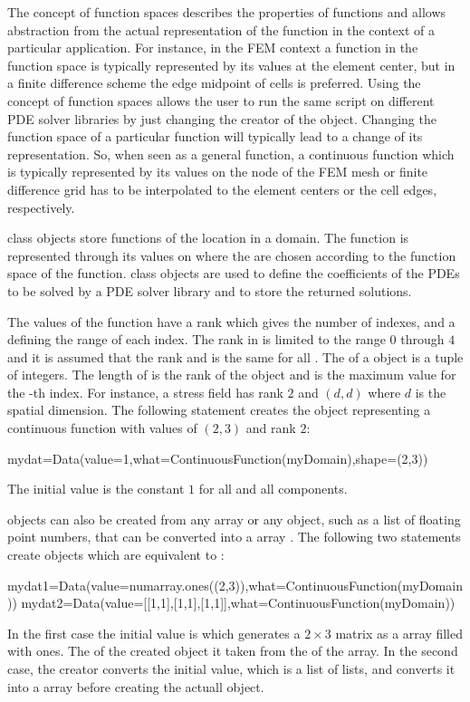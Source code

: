 The concept of function spaces describes the properties of 
functions and allows abstraction from the actual representation 
of the function in the context of a particular application. For instance, 
in the FEM context a
function in the \Function function space
is typically represented by its values at the element center, 
but in a finite difference scheme the edge midpoint of cells is preferred. 
Using the concept of function spaces 
allows the user to run the same script on different
PDE solver libraries by just changing the creator of the \Domain object.     
Changing the function space of a particular function
will typically lead to a change of its representation. 
So, when seen as a general function,
a continuous function which is typically represented by its values
on the node of the FEM mesh or finite difference grid 
has to be interpolated to the element centers or the cell edges,
respectively.

\Data class objects store functions of the location in a domain. 
The function is represented through its values on \DataSamplePoints where
the \DataSamplePoints are chosen according to the function space 
of the function.  
\Data class objects are used to define the coefficients
of the PDEs to be solved by a PDE solver library 
and to store the returned solutions.

The values of the function have a rank which gives the
number of indexes, and a \Shape defining the range of each index.
The rank in \escript is limited to the range $0$ through $4$ and
it is assumed that the rank and \Shape is the same for all \DataSamplePoints.
The \Shape of a \Data object is a tuple  of integers. The length
of  is the rank of the \Data object and  is the maximum
value for the -th index.
For instance, a stress field has rank $2$ and 
\Shape $(d,d)$ where $d$ is the spatial dimension.
The following statement creates the \Data object
 representing a 
continuous function with values 
of \Shape $(2,3)$ and rank $2$:
\begin{python}
mydat=Data(value=1,what=ContinuousFunction(myDomain),shape=(2,3))
\end{python}
The initial value is the constant $1$ for all \DataSamplePoints and
all components.

\Data objects can also be created from any \numarray
array or any object, such as a list of floating point numbers, 
that can be converted into a \numarray array . 
The following two statements
create objects which are equivalent to :
\begin{python}
mydat1=Data(value=numarray.ones((2,3)),what=ContinuousFunction(myDomain))
mydat2=Data(value=[[1,1],[1,1],[1,1]],what=ContinuousFunction(myDomain))
\end{python}
In the first case the initial value is 
which generates a $2 \times 3$ matrix as a \numarray array 
filled with ones. The \Shape of the created \Data object
it taken from the \Shape of the array. In the second
case, the creator converts the initial value, which is a list of lists,
and converts it into a \numarray array before creating the actuall
\Data object.      

